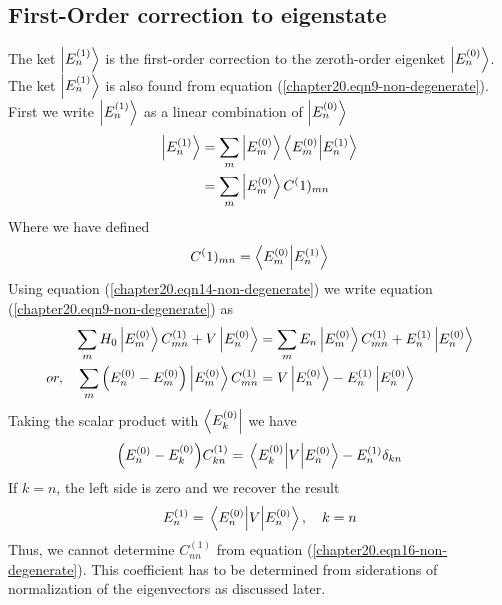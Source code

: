 \subsection{First-Order correction to eigenstate}
The ket $\ket{E_{n}^{(1)}}$ is the first-order correction to the zeroth-order eigenket $\ket{E_{n}^{(0)}}$. The ket $\ket{E_{n}^{(1)}}$ is also found from equation (\ref{chapter20.eqn9-non-degenerate}). First we write $\ket{E_{n}^{(1)}}$ as a linear combination of $\ket{E_{n}^{(0)}}$
\begin{align}
\label{chapter20.eqn13-non-degenerate}
\ket{E_{n}^{(1)}} 
&= \sum_{m} \ket{E_{m}^{(0)}} \braket{E_m^{(0)}}{E_n^{(1)}} \\
\label{chapter20.eqn14-non-degenerate}
&= \sum_{m} \ket{E_{m}^{(0)}} C^(1)_{m n}
\end{align}
Where we have defined
\begin{equation}
C^(1)_{m n} = \braket{E_m^{(0)}}{E_n^{(1)}}
\label{chapter20.eqn15-non-degenerate}
\end{equation}
Using equation (\ref{chapter20.eqn14-non-degenerate}) we write equation (\ref{chapter20.eqn9-non-degenerate}) as
\begin{align*}
	\sum_{m} H_0 \ket{E_{m}^{(0)}} C^{(1)}_{m n} + V \ket{E_{n}^{(0)}} 
	&= \sum_{m} E_n \ket{E_{m}^{(0)}} C^{(1)}_{m n} + E_{n}^{(1)} \ket{E_{n}^{(0)}} \\
	or, \quad 
	\sum_{m} \qty(E_{n}^{(0)}  -  E_{m}^{(0)}) \ket{E_{m}^{(0)}} C^{(1)}_{m n} 
	&= V \ket{E_n^{(0)}} - E_{n}^{(1)} \ket{E_{n}^{(0)}}
\end{align*}
Taking the scalar product with $\bra{E_k^{(0)}}$ we have
\begin{equation}
\qty(E_n^{(0)} - E_k^{(0)}) C^{(1)}_{k n} = \matrixel{E_k^{(0)}} {V} {E_n^{(0)}} - E_n^{(1)} \delta_{k n}
\label{chapter20.eqn16-non-degenerate}
\end{equation}
If $k=n$, the left side is zero and we recover the result
\begin{equation}
E_n^{(1)}  = \matrixel{E_n^{(0)}} {V} {E_n^{(0)}} , \quad k = n
\end{equation}
Thus, we cannot determine $C^{(1)}_{n n}$ from equation (\ref{chapter20.eqn16-non-degenerate}). This coefficient has to be determined from siderations of normalization of the eigenvectors as discussed later.\\

